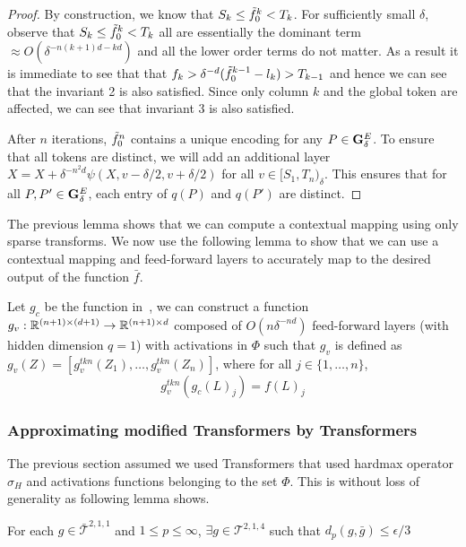 \begin{proof}
    By construction, we know that $S_k \leq \tilde{f}_0^k < T_k$.  For sufficiently small $\delta$, 
    observe that $S_k \leq \tilde{f}_0^k < T_k$ all are essentially the dominant term $ \approx O(\delta^{-n(k+1)d - kd})$ and all the lower order terms do not matter.  As a result it is 
    immediate to see that that $f_k > \delta^{-d} (\tilde{f}_0^{k-1} - l_k) > T_{k-1}$ and hence we
    can see that the invariant 2 is also satisfied. Since only column $k$ and the global token are affected,
    we can see that invariant 3 is also satisfied. 
    
    After $n$ iterations, $\tilde{f}^n_0$ contains a unique encoding for any $P \in \mathbf{G}^{E}_{\delta}$. 
    To ensure that all tokens are distinct, we will add an additional layer 
    $X = X + \delta^{-n^2d} \psi(X,v -\delta/2, v+\delta/2)$ for all $v \in [S_1, T_n)_{\delta}$. 
    This ensures that for all $P, P' \in \mathbf{G}^{E}_{\delta}$, each entry of $q(P) $ and $q(P')$ are distinct. 
\end{proof}

The previous lemma shows that we can compute a contextual mapping using only sparse transforms. 
We now use the following lemma to show that we can use a contextual mapping and feed-forward layers
to accurately map to the desired output of the function $\bar{f}$. 

\begin{lemma}
Let $g_c$ be the function in~, we can construct
a function $g_v: \mathbb{R}^{(n+1) \times (d+1)} \to \mathbb{R}^{(n+1) \times d} $ composed of 
$O(n \delta^{-nd})$ feed-forward layers (with hidden dimension $q=1$) 
with activations in $\Phi$ such that 
$g_v$ is defined as  $g_v(Z) = [g_v^{tkn}(Z_{1}), \dots, g^{tkn}_v(Z_{n})]$, 
where  for all $j \in \{1,\dots, n\}$, 
        \[ g_v^{tkn}(g_c(L)_{j}) =  f(L)_{j}  \]
\end{lemma}

\subsubsection{Approximating modified Transformers by Transformers}

The previous section assumed we used Transformers that used hardmax operator $\sigma_H$ and 
activations functions belonging to the set $\Phi$. This is without loss of generality as
following lemma shows.

\begin{lemma}
For each $g \in \bar{\mathcal{T}}^{2,1,1}$ and $1 \leq p \leq \infty$, $\exists g \in \mathcal{T}^{2,1,4}$ such that
$d_p(g,\bar{g}) \leq \epsilon/3$
\end{lemma}
    
